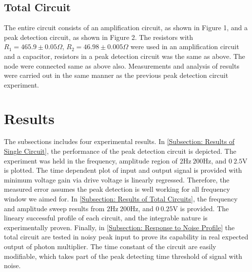 \documentclass[%
 reprint,
 amsmath,amssymb,
 aps,
floatfix,
]{revtex4-2}
\begin{document}
\subsection{Total Circuit}
The entire circuit consists of an amplification circuit, as shown in Figure 1, and a peak detection circuit, as shown in Figure 2.
The resistors with $R_1=465.9\pm0.05\Omega$, $R_2=46.98\pm0.005\Omega$ were used in an amplification circuit and a capacitor, resistors in a peak detection circuit was the same as above. 
The node were connected same as above also. 
Measurements and analysis of results were carried out in the same manner as the previous peak detection circuit experiment.

\section{Results}
 The subsections includes four experimental results.
 In \ref{Subsection: Results of Single Circuit}, the performance of the peak detection circuit is depicted.
 The experiment was held in the frequency, amplitude region of $2 \mathrm{Hz} ~ 200 \mathrm{Hz}$, and $0 ~ 2.5 \mathrm{V}$ is plotted.
 The time dependent plot of input and output signal is provided with minimum voltage gain via drive voltage is linearly regressed.
 Therefore, the measured error assumes the peak detection is well working for all frequency window we aimed for. 
 In \ref{Subsection: Results of Total Circuits}, the frequency and amplitude sweep results from $2 \mathrm{Hz} ~ 200 \mathrm{Hz}$, and $0 ~ 0.25 \mathrm{V}$ is provided.
 The lineary successful profile of each circuit, and the integrable nature is experimentally proven.
 Finally, in \ref{Subsection: Response to Noise Profile} the total circuit are tested in noisy peak input to prove its capability in real expected output of photon multiplier.
 The time constant of the circuit are easily modifiable, which takes part of the peak detecting time threshold of signal with noise. 
\end{document}
